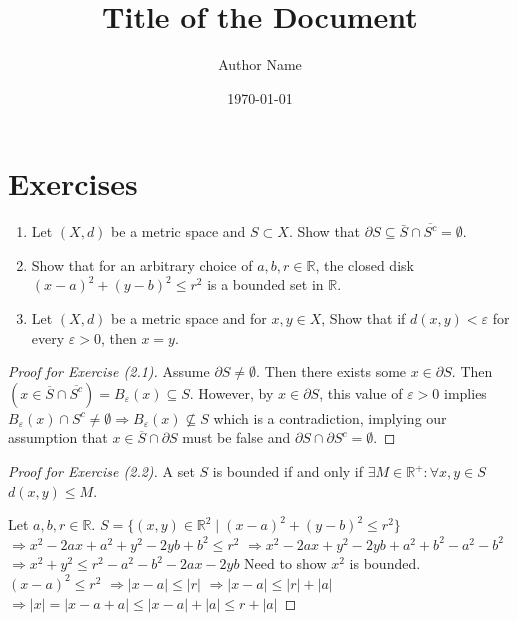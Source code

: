 \documentclass{article}
\title{\textbf{Title of the Document}}
\author{Author Name}
\date{\today}
\theoremstyle{definition}
\numberwithin{equation}{section}
\begin{document}
\maketitle
\tableofcontents
\newpage
\section{Exercises}

\begin{enumerate}
    \item[(2.1)] Let $(X, d)$ be a metric space and $S \subset X$. Show that $\partial S \subseteq \bar{S} \cap \overline{S^c} = \emptyset$.
    \item[(2.2)] Show that for an arbitrary choice of $a, b, r \in \mathbb{R}$, the closed disk $(x - a)^2 + (y - b)^2 \leq r^2$ is a bounded set in $\mathbb{R}$.
    \item[(2.3)] Let $(X,d)$ be a metric space and for $x, y \in X$, Show that if $d(x,y) < \varepsilon$ for every $\varepsilon > 0$, then $x = y$.
\end{enumerate}

\begin{proof}[Proof for Exercise (2.1)]
    Assume $\partial S \ne \emptyset$. Then there exists some $x \in \partial S$. Then $(x \in \overline{S} \cap \overline{S^c}) = B_\varepsilon(x) \subseteq S$. However, by $x \in \partial S$, this value of $\varepsilon > 0$ implies $B_\varepsilon(x) \cap S^c \ne \emptyset \Rightarrow B_\varepsilon(x) \nsubseteq S$ which is a contradiction, implying our assumption that $x \in \overline{S} \cap \partial S$ must be false and $\partial S \cap \partial S^c = \emptyset$.
\end{proof}

\begin{proof}[Proof for Exercise (2.2)]
    A set $S$ is bounded if and only if $\exists M \in \mathbb{R}^+ : \forall x, y \in S$ $d(x, y) \le M$. 

    Let $a, b, r \in \mathbb{R}$.
    $
    S = \{(x, y) \in \mathbb{R}^2 \mid (x - a)^2 + (y - b)^2 \leq r^2 \}
    $
    $
    \Rightarrow x^2 - 2ax + a^2 + y^2 - 2yb + b^2 \leq r^2
    $
    $
    \Rightarrow x^2 - 2ax + y^2 - 2yb + a^2 + b^2 - a^2 - b^2 
    $
    $
    \Rightarrow x^2 + y^2 \leq r^2 - a^2 - b^2 - 2ax - 2yb 
    $
    Need to show $x^2$ is bounded. 
    $
    (x - a)^2 \leq r^2
    $
    $
    \Rightarrow | x - a | \leq |r| 
    $
    $
    \Rightarrow | x - a | \leq |r| + | a |
    $
    $
    \Rightarrow | x | = | x - a + a | \leq | x - a | + | a | \le r + | a |
    $
\end{proof}
\end{document}
